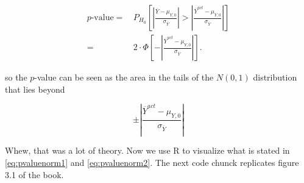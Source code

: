 \documentclass[]{book}
\theoremstyle{definition}
\theoremstyle{definition}
\theoremstyle{definition}
\theoremstyle{remark}
\begin{document}
\begin{align}
p \text{-value} =& \, P_{H_0}\left[ \left\lvert \frac{\overline{Y} - \mu_{Y,0}}{\sigma_{\overline{Y}}} \right\rvert > \left\lvert \frac{\overline{Y}^{act} - \mu_{Y,0}}{\sigma_{\overline{Y}}} \right\rvert \right] \\
=& \, 2 \cdot \Phi \left[ - \left\lvert \frac{\overline{Y}^{act} - \mu_{Y,0}}{\sigma_{\overline{Y}}}  \right\rvert\right].  \label{eq:pvaluenorm1}
\end{align}

so the \(p\)-value can be seen as the area in the tails of the
\(N(0,1)\) distribution that lies beyond

\begin{equation}
\pm \left\lvert \frac{\overline{Y}^{act} - \mu_{Y,0}}{\sigma_{\overline{Y}}} \right\rvert \label{eq:pvaluenorm2}
\end{equation}

Whew, that was a lot of theory. Now we use R to visualize what is stated
in \eqref{eq:pvaluenorm1} and \eqref{eq:pvaluenorm2}. The next code chunck
replicates figure 3.1 of the book.
\end{document}

